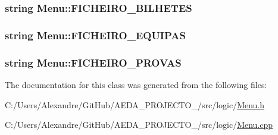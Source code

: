 \subsubsection[{F\+I\+C\+H\+E\+I\+R\+O\+\_\+\+B\+I\+L\+H\+E\+T\+E\+S}]{\setlength{\rightskip}{0pt plus 5cm}string Menu\+::\+F\+I\+C\+H\+E\+I\+R\+O\+\_\+\+B\+I\+L\+H\+E\+T\+E\+S\hspace{0.3cm}{\ttfamily [private]}}\label{class_menu_aa976bc24d00fe46961f952d5f50018bb}
\hypertarget{class_menu_ae54280f85716f145088ac12362643990}{}
\subsubsection[{F\+I\+C\+H\+E\+I\+R\+O\+\_\+\+E\+Q\+U\+I\+P\+A\+S}]{\setlength{\rightskip}{0pt plus 5cm}string Menu\+::\+F\+I\+C\+H\+E\+I\+R\+O\+\_\+\+E\+Q\+U\+I\+P\+A\+S\hspace{0.3cm}{\ttfamily [private]}}\label{class_menu_ae54280f85716f145088ac12362643990}
\hypertarget{class_menu_a01ed844b35f6f85bd5e71457309cee88}{}
\subsubsection[{F\+I\+C\+H\+E\+I\+R\+O\+\_\+\+P\+R\+O\+V\+A\+S}]{\setlength{\rightskip}{0pt plus 5cm}string Menu\+::\+F\+I\+C\+H\+E\+I\+R\+O\+\_\+\+P\+R\+O\+V\+A\+S\hspace{0.3cm}{\ttfamily [private]}}\label{class_menu_a01ed844b35f6f85bd5e71457309cee88}


The documentation for this class was generated from the following files\+:\begin{DoxyCompactItemize}
\item 
C\+:/\+Users/\+Alexandre/\+Git\+Hub/\+A\+E\+D\+A\+\_\+\+P\+R\+O\+J\+E\+C\+T\+O\+\_/src/logic/\hyperlink{_menu_8h}{Menu.\+h}\item 
C\+:/\+Users/\+Alexandre/\+Git\+Hub/\+A\+E\+D\+A\+\_\+\+P\+R\+O\+J\+E\+C\+T\+O\+\_/src/logic/\hyperlink{_menu_8cpp}{Menu.\+cpp}\end{DoxyCompactItemize}
